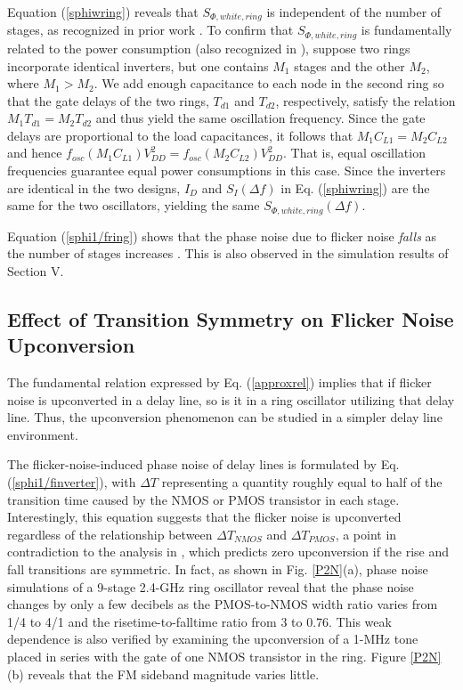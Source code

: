 Equation (\ref{sphiwring}) reveals that $S_{\Phi, white, ring}$ is independent of the number of stages, as recognized in prior work \cite{Abidi,Hajimiri}. To confirm that $S_{\Phi,
white, ring}$ is fundamentally related to the power consumption (also recognized in \cite{Abidi,Hajimiri}),
suppose two rings incorporate identical inverters, but one contains
$M_1$ stages and the other $M_2$, where $M_1>M_2$. We add enough capacitance to each
node in the second ring so that the gate delays of the two rings, $T_{d1}$ and
$T_{d2}$, respectively, satisfy the relation $M_1 T_{d1}=M_2 T_{d2}$ and thus yield the same oscillation frequency. 
Since the gate delays are proportional to the load capacitances, it follows that $M_1 C_{L1}=M_2 C_{L2}$ and hence $f_{osc}(M_1 C_{L1})V_{DD}^2=f_{osc}(M_2
C_{L2})V_{DD}^2$. That is, equal oscillation frequencies guarantee equal power consumptions in this case.
Since the inverters are identical in the two designs, $I_D$ and $S_I(\Delta f)$ in Eq. (\ref{sphiwring}) are the same for the two oscillators, yielding the same
$S_{\Phi,white, ring}(\Delta f)$.

Equation (\ref{sphi1/fring}) shows that the phase noise due to flicker noise {\em falls} as the number of stages increases \cite{Abidi}. This is also
observed in the simulation results of Section V.



\subsection{Effect of Transition Symmetry on Flicker Noise Upconversion}

The fundamental relation expressed by Eq. (\ref{approxrel}) implies that if flicker noise is upconverted in a delay line, so is it in a ring oscillator utilizing that delay line.
Thus, the upconversion phenomenon can be studied in a simpler delay line environment.

The flicker-noise-induced phase noise of delay lines is formulated by Eq. (\ref{sphi1/finverter}), with $\Delta T$ representing a quantity roughly equal to half of the transition time
caused by the NMOS or PMOS transistor in each stage. Interestingly, this equation suggests that the flicker noise is upconverted regardless of the relationship between $\Delta
T_{NMOS}$ and $\Delta T_{PMOS}$, a point in contradiction to the analysis in \cite{Hajimiri}, which predicts zero upconversion if the rise and fall transitions are symmetric. In fact,
as shown in Fig. \ref{P2N}(a), phase noise simulations of a 9-stage 2.4-GHz ring oscillator reveal that the phase noise changes by only a few decibels as the PMOS-to-NMOS width ratio
varies from 1/4 to 4/1 and the risetime-to-falltime ratio from 3 to 0.76. This weak dependence is also verified by examining the upconversion of a 1-MHz tone placed in series with
the gate of one NMOS transistor in the ring. Figure \ref{P2N}(b) reveals that the FM sideband magnitude varies little.

